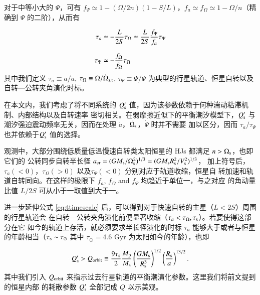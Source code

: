 对于中等小大的 $\Psi$，可有 $f_\Psi \simeq 1 - (\Omega/2n) (1-S/L)$，$f_a \simeq f_\Omega \simeq 1
 - \Omega/n$（精确到 $\Psi$ 的二阶），从而有
 
\begin{subequations} \label{eq:ttimescale}
\setlength{\jot}{10pt}
\begin{align}
    \tau_a &\simeq - \frac{L}{2S}\tau_\Omega \simeq \frac{L}{2S} \frac{f_\Psi}{f_a} \tau_\Psi \\
    \tau_\Psi &\simeq -\frac{f_\Omega}{f_\Omega} \tau_\Omega 
\end{align}
\end{subequations} %
其中我们定义 $\tau_a \equiv a /{\dot a}$,  $\tau_\Omega \equiv \Omega / {\dot \Omega}_{\mathrm{s, t}}$, 
$\tau_\Psi \equiv \Psi / {\dot \Psi}$ 为典型的行星轨道、恒星自转以及自转---公转夹角演化时标。

在本文内，我们考虑了将不同系统的 $Q_\mathrm{s}^\prime$ 值，因为该参数依赖于何种湍动粘滞机制\cite{
Zahn1977,Goldreich1989,Penev2007}、内部结构\cite{Terquem1998,Goodman2009}以及自转速率
\cite{Ogilvie2007,Barker2009}密切相关。在弱摩擦近似下的平衡潮汐模型下，$Q_\mathrm{s}^\prime$ 与
潮汐强迫震动频率无关，因而在处理 $\dot{a}$，$\dot{\Omega}_\mathrm{s}$，$\dot{\varPsi}$ 时并不需要
加以区分，因而 $\tau_a / \tau_\Psi$ 也并依赖于$Q_\mathrm{s}^\prime$ 值的选择。

观测中，大部分围绕低质量低温慢速自转类太阳恒星的 HJs 都满足 $n>\Omega_\mathrm{s}$，也即它们的
公转同步自转半长径 $a_\mathrm{cr} = (GM_\mathrm{s}/\Omega_\mathrm{s}^2)^{1/3} = (GM_\mathrm{s}R_\mathrm{s}^2/V_\mathrm{s}^2)^{1/3}$，
加上符号后，$\tau_a (<0)$，$\tau_\Omega (>0)$ 以及$\tau_\Psi (<0)$ 分别对应于轨道收缩，恒星自
转加速和轨道自转同向。在这样的极限下 $f_a$, $f_\Omega$ and $f_\Psi$ 均趋近于单位一，与之对应
的角动量比值 $L/2S$ 可从小于一取值到大于一。

进一步延伸公式 \ref{eq:ttimescale} 后，可以得到对于快速自转的主星（$L<2S$）周围的行星轨道会
在自转---公转夹角演化前便显著收缩（$\tau_a < \tau_{\Omega},\tau_\mathrm{s}$）。若要使得这部分在它
如今的轨道上存活，就必须要求半长径演化的时标 $\tau_a$ 能够大于或者与恒星的年龄相当（$\tau_
\mathrm{s}\sim \tau_\odot$ 其中 $\tau_\odot =4.6$ Gyr 为太阳如今的年龄），也即

\begin{equation} \label{eq:qorbit} 
Q_\mathrm{s}^\prime > Q_{\rm orbit} \equiv {9 \tau_\mathrm{s} \over 2} 
{M_\mathrm{p} \over M_\mathrm{s}}  \left( {G M_\mathrm{s} \over R_\mathrm{s}^3} \right)^{1/2}
\left({R_\mathrm{s} \over a} \right)^{13/2}.
\end{equation}  %
其中我们引入 $Q_{\rm orbit}$ 来指示过去行星轨道的平衡潮演化参数。这里我们将前文提到的恒星内部
的耗散参数 $Q_\mathrm{s}^\prime $ 全部记成 $Q$ 以示美观。

